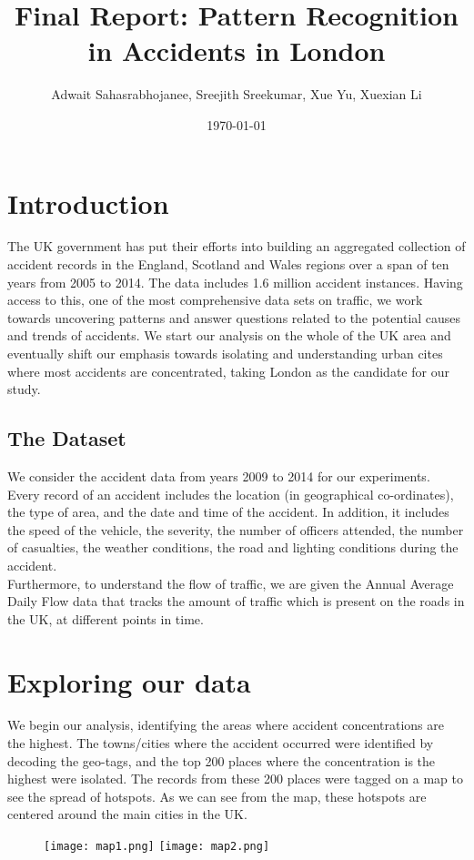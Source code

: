 \documentclass{neu_handout}
\title{Final Report: Pattern Recognition in Accidents in London}
\author{Adwait Sahasrabhojanee, Sreejith Sreekumar, Xue Yu, Xuexian Li}
\date{\today}
\begin{document}
\section{Introduction}
The UK government has put their efforts into building an aggregated collection of accident records in the England, Scotland and Wales regions
over a span of ten years from 2005 to 2014. The data includes 1.6 million accident instances. Having access to this, one of the most comprehensive data sets on traffic, we work towards
uncovering patterns and answer questions related to the potential causes and trends of accidents. We start our analysis on the whole of the UK area and eventually shift our emphasis towards
isolating and understanding urban cites where most accidents are concentrated, taking London as the candidate for our study.

\subsection{The Dataset}
We consider the accident data from years 2009 to 2014 for our experiments. Every record of an accident includes the location (in geographical co-ordinates), the type of area, and the date and time of the accident. In addition, it includes the speed of the vehicle, the severity, the number of officers attended, the number of casualties, the weather conditions, the road and lighting conditions during the accident. \\

Furthermore, to understand the flow of traffic, we are given the Annual Average Daily Flow data that tracks the amount of traffic which is present on the roads in the UK, at different points in time. \\

\section{Exploring our data}
We begin our analysis, identifying the areas where accident concentrations are the highest. The towns/cities where the accident occurred were identified by decoding the geo-tags, and the top 200 places where the concentration is the highest were isolated. The records from these 200 places were tagged on a map to see the spread of hotspots. As we can see from the map, these hotspots are centered around the main cities in the UK.

\begin{figure}[!htb]
  \texttt{[image: map1.png]}
  \endminipage\hfill
{}
  \texttt{[image: map2.png]}
\endminipage
\end{figure}
\end{document}
